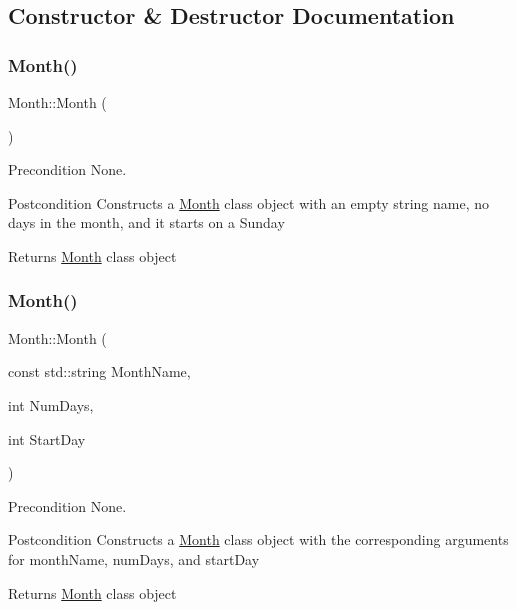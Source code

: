 \subsection{Constructor \& Destructor Documentation}
\hypertarget{class_month_a36882c55ece9c4210ec1b01bd665ec89}{}\label{class_month_a36882c55ece9c4210ec1b01bd665ec89} 
\subsubsection{\texorpdfstring{Month()}{Month()}\hspace{0.1cm}{\footnotesize\ttfamily [1/2]}}
{\footnotesize\ttfamily Month\+::\+Month (\begin{DoxyParamCaption}{ }\end{DoxyParamCaption})}

\begin{DoxyPrecond}{Precondition}
None. 
\end{DoxyPrecond}
\begin{DoxyPostcond}{Postcondition}
Constructs a \hyperlink{class_month}{Month} class object with an empty string name, no days in the month, and it starts on a Sunday 
\end{DoxyPostcond}
\begin{DoxyReturn}{Returns}
\hyperlink{class_month}{Month} class object 
\end{DoxyReturn}
\hypertarget{class_month_ae2b064f3abf4c38a9e2527920831ed3f}{}\label{class_month_ae2b064f3abf4c38a9e2527920831ed3f} 
\subsubsection{\texorpdfstring{Month()}{Month()}\hspace{0.1cm}{\footnotesize\ttfamily [2/2]}}
{\footnotesize\ttfamily Month\+::\+Month (\begin{DoxyParamCaption}\item[{const std\+::string}]{Month\+Name,  }\item[{int}]{Num\+Days,  }\item[{int}]{Start\+Day }\end{DoxyParamCaption})}

\begin{DoxyPrecond}{Precondition}
None. 
\end{DoxyPrecond}
\begin{DoxyPostcond}{Postcondition}
Constructs a \hyperlink{class_month}{Month} class object with the corresponding arguments for month\+Name, num\+Days, and start\+Day 
\end{DoxyPostcond}
\begin{DoxyReturn}{Returns}
\hyperlink{class_month}{Month} class object 
\end{DoxyReturn}


